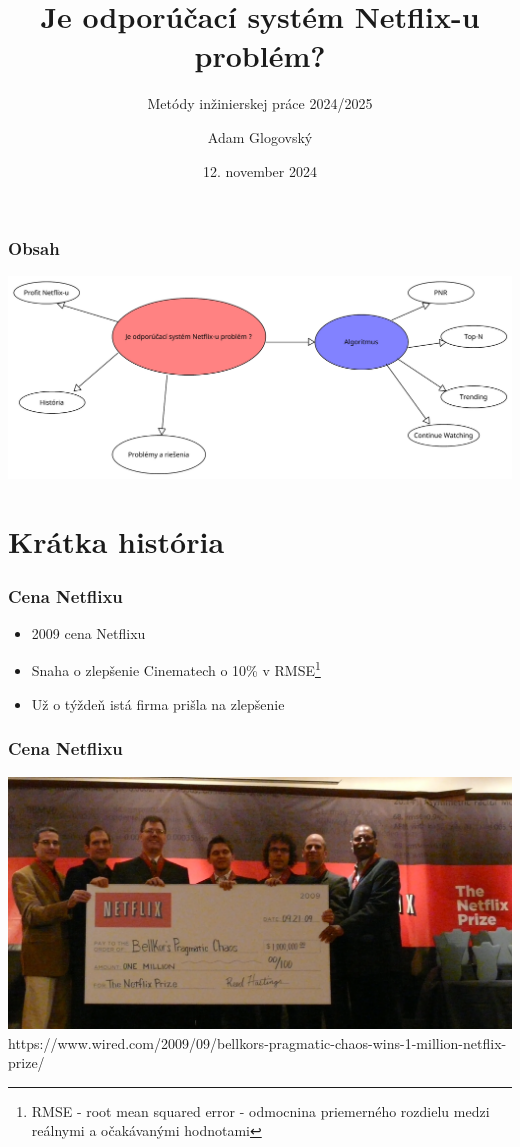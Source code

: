 \documentclass{beamer}
\author{Adam Glogovský}
\institute{
	Fakulta informatiky a informačných technológií\\
	Slovenská technická univerzita v Bratislave}
\subtitle{\vspace{3mm} Metódy inžinierskej práce 2024/2025}
\title{Je odporúčací systém Netflix-u problém?
}
\date{\footnotesize 12. november 2024}
\newcommand{\footcite}[1]{\footnote{\tiny #1}}
\begin{document}
\begin{frame}[fragile=singleslide]
    \titlepage
\end{frame}

\begin{frame}[fragile=singleslide]\frametitle{Obsah}
    \includegraphics[scale=.35]{UvodnyDiagram.pdf}
\end{frame}



\section{Krátka história}

\begin{frame}[fragile=singleslide]\frametitle{Cena Netflixu}
    \begin{itemize}
        \item 2009 cena Netflixu
        \item Snaha o zlepšenie Cinematech o 10\% v RMSE\footcite{RMSE - root mean squared error - odmocnina priemerného rozdielu medzi reálnymi a očakávanými hodnotami}

        \item Už o týždeň istá firma prišla na zlepšenie
    \end{itemize}
\end{frame}

\begin{frame}[fragile=singleslide]\frametitle{Cena Netflixu}

    \includegraphics[scale=.13]{NetflixPrize.png}
    {\tiny https://www.wired.com/2009/09/bellkors-pragmatic-chaos-wins-1-million-netflix-prize/}

    {\tiny }
\end{frame}
\end{document}
